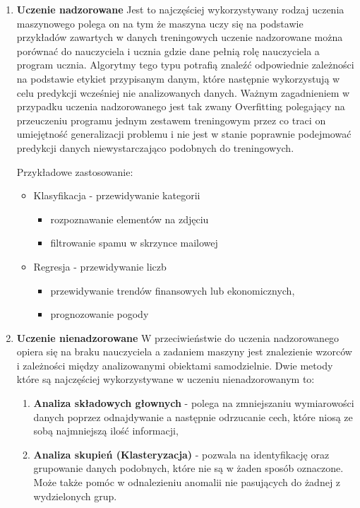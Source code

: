 \begin{enumerate}
    \item \textbf{Uczenie nadzorowane}
    Jest to najczęściej wykorzystywany rodzaj uczenia maszynowego polega on na tym 
    że maszyna uczy się na podstawie przykładów zawartych w danych treningowych 
    uczenie nadzorowane można porównać do nauczyciela i ucznia gdzie dane pełnią rolę nauczyciela 
    a program ucznia. Algorytmy tego typu potrafią znaleźć odpowiednie zależności na podstawie
    etykiet przypisanym danym,
    które następnie wykorzystują w celu predykcji wcześniej nie analizowanych danych.
    Ważnym zagadnieniem w przypadku uczenia nadzorowanego jest tak zwany Overfitting polegający 
    na przeuczeniu programu jednym zestawem treningowym przez co traci on umiejętność generalizacji problemu
    i nie jest w stanie poprawnie podejmować predykcji danych niewystarczająco podobnych
    do treningowych.

    Przykładowe zastosowanie:
    \begin{itemize}
        \item Klasyfikacja - przewidywanie kategorii
        \begin{itemize}
            \item rozpoznawanie elementów na zdjęciu
            \item filtrowanie spamu w skrzynce mailowej
        \end{itemize}
        \item Regresja - przewidywanie liczb
        \begin{itemize}
            \item przewidywanie trendów finansowych lub ekonomicznych,
            \item prognozowanie pogody
        \end{itemize}
    \end{itemize}
    \item \textbf{Uczenie nienadzorowane}
    W przeciwieństwie do uczenia nadzorowanego opiera się na braku
    nauczyciela a zadaniem maszyny jest znalezienie wzorców i zależności między analizowanymi
    obiektami samodzielnie. Dwie metody które są najczęściej wykorzystywane w uczeniu nienadzorowanym
    to:
    \begin{enumerate}
        \item \textbf{Analiza składowych głownych} - polega na zmniejszaniu wymiarowości danych poprzez
        odnajdywanie a następnie odrzucanie cech, które niosą ze sobą najmniejszą ilość informacji,
        \item \textbf{Analiza skupień (Klasteryzacja)} - pozwala na identyfikację oraz grupowanie danych
        podobnych, które nie są w żaden sposób oznaczone. Może także pomóc w odnalezieniu anomalii
        nie pasujących do żadnej z wydzielonych grup.
        

\end{enumerate}
\end{enumerate}
